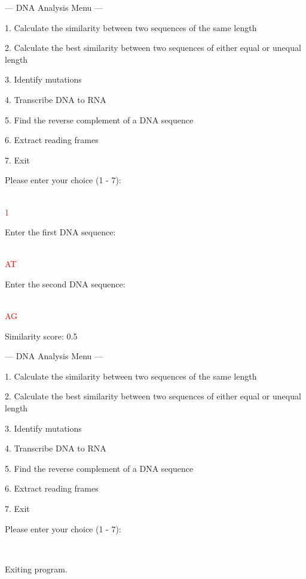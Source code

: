 \begin{sample}

    --- DNA Analysis Menu ---
    
    1. Calculate the similarity between two sequences of the same length
    
    2. Calculate the best similarity between two sequences of either equal or unequal length
    
    3. Identify mutations
    
    4. Transcribe DNA to RNA
    
    5. Find the reverse complement of a DNA sequence
    
    6. Extract reading frames
    
    7. Exit
    
    Please enter your choice (1 - 7): 
    
    \\\textcolor{red}{1}

    Enter the first DNA sequence:

    \\\textcolor{red}{AT}

    Enter the second DNA sequence: 

    \\\textcolor{red}{AG}

    Similarity score: 0.5
    
    --- DNA Analysis Menu ---
    
    1. Calculate the similarity between two sequences of the same length
   
    2. Calculate the best similarity between two sequences of either equal or unequal length
    
    3. Identify mutations
    
    4. Transcribe DNA to RNA
    
    5. Find the reverse complement of a DNA sequence
    
    6. Extract reading frames
    
    7. Exit
    
    Please enter your choice (1 - 7): 
    
    \\\textcolor{red}{}
    
    Exiting program.
\end{sample}


